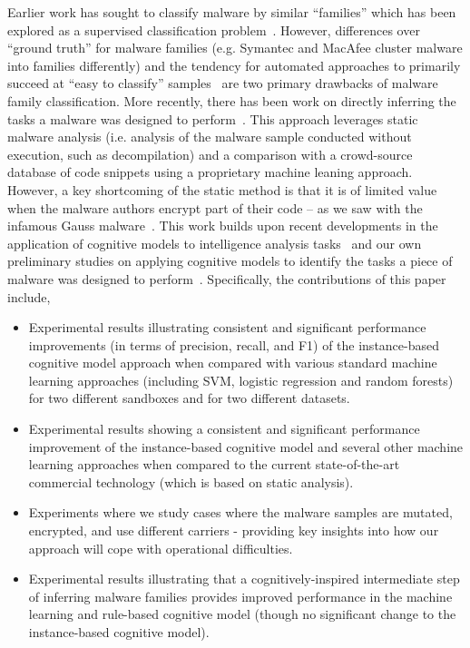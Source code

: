 \documentclass[conference]{IEEEtran}
\begin{document}
Earlier work has sought to classify malware by similar ``families'' which has been explored as a supervised classification problem~\cite{Bayer_scalable,Kinable:2011,Kong:2013}.  However, differences over ``ground truth'' for malware families (e.g. Symantec and MacAfee cluster malware into families differently) and the tendency for automated approaches to primarily succeed at ``easy to classify'' samples~\cite{Li07onchallenges,PerdisciU12} are two primary drawbacks of malware family classification.  More recently, there has been work on directly inferring the tasks a malware was designed to perform~\cite{invencia}.  This approach leverages static malware analysis (i.e. analysis of the malware sample conducted without execution, such as decompilation) and a comparison with a crowd-source database of code snippets using a proprietary machine leaning approach.  However, a key shortcoming of the static method is that it is of limited value when the malware authors encrypt part of their code -- as we saw with the infamous Gauss malware~\cite{Gauss}.  This work builds upon recent developments in the application of cognitive models to intelligence analysis tasks~\cite{Lebiere:2013} and our own preliminary studies on applying cognitive models to identify the tasks a piece of malware was designed to perform~\cite{iccm:2015,brims}.  Specifically, the contributions of this paper include,
\vspace{0em}
\begin{itemize}
	\setlength{\itemsep}{-1pt}
	\item{Experimental results illustrating consistent and significant performance improvements (in terms of precision, recall, and F1) of the instance-based cognitive model approach when compared with various standard machine learning approaches (including SVM, logistic regression and random forests) for two different sandboxes and for two different datasets.} 
	\item{Experimental results showing a consistent and significant performance improvement of the instance-based cognitive model and several other machine learning approaches when compared to the current state-of-the-art commercial technology (which is based on static analysis).}
	\item{Experiments where we study cases where the malware samples are mutated, encrypted, and use different carriers - providing key insights into how our approach will cope with operational difficulties.}
	\item{Experimental results illustrating that a cognitively-inspired intermediate step of inferring malware families provides improved performance in the machine learning and rule-based cognitive model (though no significant change to the instance-based cognitive model).}
\end{itemize}
\end{document}

